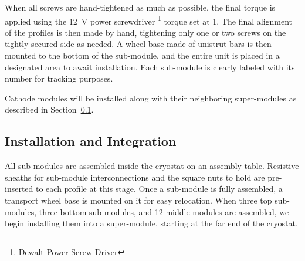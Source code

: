 When all screws are hand-tightened as much as possible, the final torque is applied using the \SI{12}{\V} power screwdriver \footnote{Dewalt\texttrademark{} Power Screw Driver} torque set at \num{1}. The final alignment of the profiles is then made by hand, tightening only one or two screws on the tightly secured side as needed. 
A wheel base made of unistrut bars is then mounted to the bottom of the sub-module, and the entire unit is placed in a designated area to await installation. Each sub-module is clearly labeled with its %
number for tracking purposes.

Cathode modules will be %
installed along with their neighboring %
 super-modules %
as described in Section~\ref{sec:fddp-hv-transport-install}.

\subsection{Installation and Integration}
\label{sec:fddp-hv-transport-install}
All  sub-modules are assembled inside the cryostat on an assembly table. Resistive sheaths for sub-module interconnections and the square nuts to hold  are pre-inserted to each profile at this stage.
Once a sub-module is fully assembled, a transport wheel base is mounted on it for easy relocation.
When three top sub-modules, three bottom sub-modules, and \num{12} middle modules are assembled, we begin installing them into a super-module, starting at the far end of the cryostat. %


